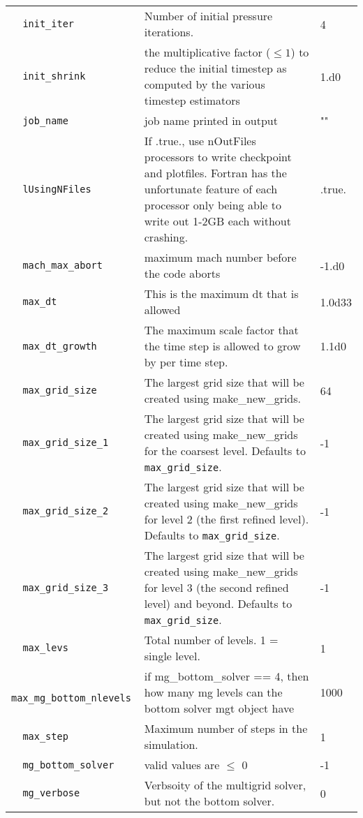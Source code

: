 \begin{landscape}
{\begin{center}
\begin{longtable}{|l|p{5.25in}|l|}
\verb=  init_iter  = &   Number of initial pressure iterations.  &  4 \\
\rowcolor{tableShade}
\verb=  init_shrink  = &   the multiplicative factor ($\le 1$) to reduce the initial timestep as computed by the various timestep estimators  &  1.d0 \\
\verb=  job_name  = &   job name printed in output  &  "" \\
\rowcolor{tableShade}
\verb=  lUsingNFiles  = &   If .true., use nOutFiles processors to write checkpoint and plotfiles. Fortran has the unfortunate feature of each processor only being able to write out 1-2GB each without crashing.  &  .true. \\
\verb=  mach_max_abort  = &   maximum mach number before the code aborts  &  -1.d0 \\
\rowcolor{tableShade}
\verb=  max_dt  = &   This is the maximum dt that is allowed  &  1.0d33 \\
\verb=  max_dt_growth  = &   The maximum scale factor that the time step is allowed to grow by per time step.  &  1.1d0 \\
\rowcolor{tableShade}
\verb=  max_grid_size  = &   The largest grid size that will be created using make\_new\_grids.  &  64 \\
\verb=  max_grid_size_1  = &   The largest grid size that will be created using make\_new\_grids for the coarsest level.  Defaults to {\tt max\_grid\_size}.  &  -1 \\
\rowcolor{tableShade}
\verb=  max_grid_size_2  = &   The largest grid size that will be created using make\_new\_grids for level 2 (the first refined level).  Defaults to {\tt max\_grid\_size}.  &  -1 \\
\verb=  max_grid_size_3  = &   The largest grid size that will be created using make\_new\_grids for level 3 (the second refined level) and beyond.  Defaults to {\tt max\_grid\_size}.  &  -1 \\
\rowcolor{tableShade}
\verb=  max_levs  = &   Total number of levels.  1 = single level.  &  1 \\
\verb=  max_mg_bottom_nlevels  = &   if mg\_bottom\_solver == 4, then how many mg levels can the bottom solver mgt object have  &  1000 \\
\rowcolor{tableShade}
\verb=  max_step  = &   Maximum number of steps in the simulation.  &  1 \\
\verb=  mg_bottom_solver  = &   valid values are $\le$ 0  &  -1 \\
\rowcolor{tableShade}
\verb=  mg_verbose  = &   Verbsoity of the multigrid solver, but not the bottom solver.  &  0 \\

\end{longtable}
\end{center}}
\end{landscape}
